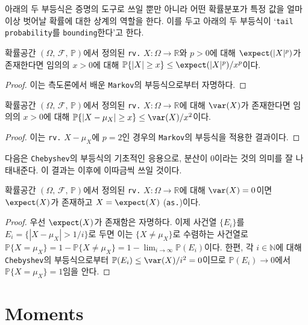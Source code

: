 아래의 두 부등식은 증명의 도구로 쓰일 뿐만 아니라 어떤 확률분포가 특정 값을 얼마 이상 벗어날 확률에 대한 상계의 역할을 한다. 이를 두고 아래의 두 부등식이 `\texttt{tail probability}를 \texttt{bounding}한다'고 한다.

\begin{theorem}
    확률공간 $(\Omega,\,\mathcal{F},\,\mathbb{P})$에서 정의된 \texttt{rv.} $X:\Omega\to\mathbb{R}$와 $p>0$에 대해 $\expect(|X|^p)$가 존재한다면 임의의 $x>0$에 대해 $\mathbb{P}\{|X|\geq x\}\leq\expect(|X|^p)/x^p$이다.
\end{theorem}

\begin{proof}
    이는 측도론에서 배운 \texttt{Markov}의 부등식으로부터 자명하다.
\end{proof}

\begin{corollary}
    확률공간 $(\Omega,\,\mathcal{F},\,\mathbb{P})$에서 정의된 \texttt{rv.} $X:\Omega\to\mathbb{R}$에 대해 $\var(X)$가 존재한다면 임의의 $x>0$에 대해 $\mathbb{P}\{|X-\mu_X|\geq x\}\leq\var(X)/x^2$이다.
\end{corollary}

\begin{proof}
    이는 \texttt{rv.} $X-\mu_X$에 $p=2$인 경우의 \texttt{Markov}의 부등식을 적용한 결과이다.
\end{proof}

다음은 \texttt{Chebyshev}의 부등식의 기초적인 응용으로, 분산이 $0$이라는 것의 의미를 잘 나태내준다. 이 결과는 이후에 이따금씩 쓰일 것이다.

\begin{proposition}
    확률공간 $(\Omega,\,\mathcal{F},\,\mathbb{P})$에서 정의된 \texttt{rv.} $X:\Omega\to\mathbb{R}$에 대해 $\var(X)=0$이면 $\expect(X)$가 존재하고 $X=\expect(X)$ (\texttt{as.})이다.
\end{proposition}

\begin{proof}
    우선 $\expect(X)$가 존재함은 자명하다. 이제 사건열 $\{E_i\}$를 $E_i=\{|X-\mu_X|>1/i\}$로 두면 이는 $\{X\ne\mu_X\}$로 수렴하는 사건열로 $\mathbb{P}\{X=\mu_X\}=1-\mathbb{P}\{X\ne\mu_X\}=1-\lim_{i\to\infty}\mathbb{P}(E_i)$이다. 한편, 각 $i\in\mathbb{N}$에 대해 \texttt{Chebyshev}의 부등식으로부터 $\mathbb{P}(E_i)\leq\var(X)/i^2=0$이므로 $\mathbb{P}(E_i)\to0$에서 $\mathbb{P}\{X=\mu_X\}=1$임을 안다.
\end{proof}

\section{Moments}

